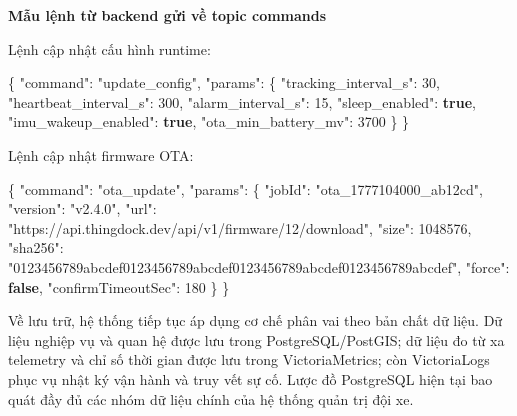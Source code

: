 \documentclass[a4paper]{extarticle}
\newenvironment{Shaded}{}{}
\newcommand{\DataTypeTok}[1]{\textcolor[rgb]{0.56,0.13,0.00}{#1}}
\newcommand{\DecValTok}[1]{\textcolor[rgb]{0.25,0.63,0.44}{#1}}
\newcommand{\FunctionTok}[1]{\textcolor[rgb]{0.02,0.16,0.49}{#1}}
\newcommand{\KeywordTok}[1]{\textcolor[rgb]{0.00,0.44,0.13}{\textbf{#1}}}
\newcommand{\StringTok}[1]{\textcolor[rgb]{0.25,0.44,0.63}{#1}}
\newcommand{\thesisterm}[1]{{\rmfamily #1}}
\begin{document}
\textbf{Mẫu lệnh từ backend gửi về topic \thesisterm{commands}}

Lệnh cập nhật cấu hình runtime:

\begin{Shaded}
\begin{Highlighting}[]
\FunctionTok{\{}
  \DataTypeTok{"command"}\FunctionTok{:} \StringTok{"update\_config"}\FunctionTok{,}
  \DataTypeTok{"params"}\FunctionTok{:} \FunctionTok{\{}
    \DataTypeTok{"tracking\_interval\_s"}\FunctionTok{:} \DecValTok{30}\FunctionTok{,}
    \DataTypeTok{"heartbeat\_interval\_s"}\FunctionTok{:} \DecValTok{300}\FunctionTok{,}
    \DataTypeTok{"alarm\_interval\_s"}\FunctionTok{:} \DecValTok{15}\FunctionTok{,}
    \DataTypeTok{"sleep\_enabled"}\FunctionTok{:} \KeywordTok{true}\FunctionTok{,}
    \DataTypeTok{"imu\_wakeup\_enabled"}\FunctionTok{:} \KeywordTok{true}\FunctionTok{,}
    \DataTypeTok{"ota\_min\_battery\_mv"}\FunctionTok{:} \DecValTok{3700}
  \FunctionTok{\}}
\FunctionTok{\}}
\end{Highlighting}
\end{Shaded}

Lệnh cập nhật firmware OTA:

\begin{Shaded}
\begin{Highlighting}[]
\FunctionTok{\{}
  \DataTypeTok{"command"}\FunctionTok{:} \StringTok{"ota\_update"}\FunctionTok{,}
  \DataTypeTok{"params"}\FunctionTok{:} \FunctionTok{\{}
    \DataTypeTok{"jobId"}\FunctionTok{:} \StringTok{"ota\_1777104000\_ab12cd"}\FunctionTok{,}
    \DataTypeTok{"version"}\FunctionTok{:} \StringTok{"v2.4.0"}\FunctionTok{,}
    \DataTypeTok{"url"}\FunctionTok{:} \StringTok{"https://api.thingdock.dev/api/v1/firmware/12/download"}\FunctionTok{,}
    \DataTypeTok{"size"}\FunctionTok{:} \DecValTok{1048576}\FunctionTok{,}
    \DataTypeTok{"sha256"}\FunctionTok{:}
      \StringTok{"0123456789abcdef0123456789abcdef0123456789abcdef0123456789abcdef"}\FunctionTok{,}
    \DataTypeTok{"force"}\FunctionTok{:} \KeywordTok{false}\FunctionTok{,}
    \DataTypeTok{"confirmTimeoutSec"}\FunctionTok{:} \DecValTok{180}
  \FunctionTok{\}}
\FunctionTok{\}}
\end{Highlighting}
\end{Shaded}

Về lưu trữ, hệ thống tiếp tục áp dụng cơ chế phân vai theo bản chất dữ liệu. Dữ
liệu nghiệp vụ và quan hệ được lưu trong PostgreSQL/PostGIS; dữ liệu đo từ xa telemetry và
chỉ số thời gian được lưu trong VictoriaMetrics; còn VictoriaLogs phục vụ nhật ký
vận hành và truy vết sự cố. Lược đồ PostgreSQL hiện tại bao quát đầy đủ các nhóm
dữ liệu chính của hệ thống quản trị đội xe.
\end{document}
